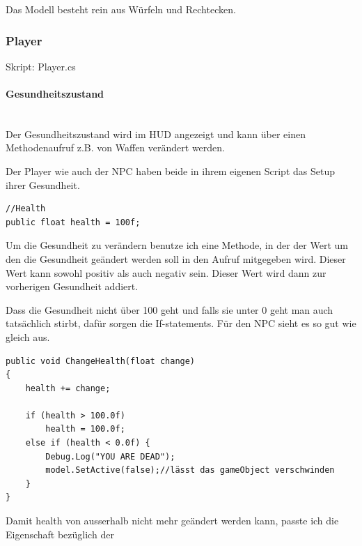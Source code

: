 Das Modell besteht rein aus Würfeln und Rechtecken.


\subsubsection{Player}
Skript: Player.cs\\

\paragraph{Gesundheitszustand}\mbox{} \\
Der Gesundheitszustand wird im HUD angezeigt und kann über einen Methodenaufruf z.B. von Waffen verändert werden.

Der Player wie auch der NPC haben beide in ihrem eigenen Script das Setup ihrer Gesundheit.
\begin{lstlisting}
//Health
public float health = 100f;
\end{lstlisting}
Um die Gesundheit zu verändern benutze ich eine Methode, in der der Wert um den die Gesundheit geändert werden soll in den Aufruf mitgegeben wird. Dieser Wert kann sowohl positiv als auch negativ sein.
Dieser Wert wird dann zur vorherigen Gesundheit addiert.

Dass die Gesundheit nicht über 100 geht und falls sie unter 0 geht man auch tatsächlich stirbt, dafür sorgen die If-statements. Für den NPC sieht es so gut wie gleich aus.
\begin{lstlisting}
public void ChangeHealth(float change)
{
	health += change;

	if (health > 100.0f)
		health = 100.0f;
	else if (health < 0.0f) {
		Debug.Log("YOU ARE DEAD");
		model.SetActive(false);//lässt das gameObject verschwinden
	}
}
\end{lstlisting}

Damit health von ausserhalb nicht mehr geändert werden kann, passte ich die Eigenschaft bezüglich der

